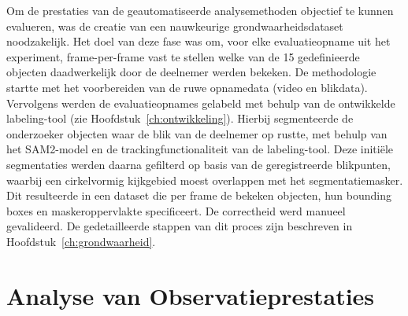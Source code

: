 Om de prestaties van de geautomatiseerde analysemethoden objectief te kunnen evalueren, was de creatie van een nauwkeurige 
grondwaarheidsdataset noodzakelijk. Het doel van deze fase was om, voor elke evaluatieopname uit het experiment, 
frame-per-frame vast te stellen welke van de 15 gedefinieerde objecten daadwerkelijk door de deelnemer werden bekeken. 
De methodologie startte met het voorbereiden van de ruwe opnamedata (video en blikdata). 
Vervolgens werden de evaluatieopnames gelabeld met behulp van de ontwikkelde labeling-tool (zie Hoofdstuk~\ref{ch:ontwikkeling}).
Hierbij segmenteerde de onderzoeker objecten waar de blik van de deelnemer op rustte, met behulp van het SAM2-model en de trackingfunctionaliteit van de labeling-tool.
Deze initiële segmentaties werden daarna gefilterd op basis van de geregistreerde blikpunten, waarbij een cirkelvormig kijkgebied moest overlappen met het segmentatiemasker. 
Dit resulteerde in een dataset die per frame de bekeken objecten, hun bounding boxes en maskeroppervlakte specificeert. 
De correctheid werd manueel gevalideerd. De gedetailleerde stappen van dit proces zijn beschreven in Hoofdstuk~\ref{ch:grondwaarheid}.

\section{Analyse van Observatieprestaties}

